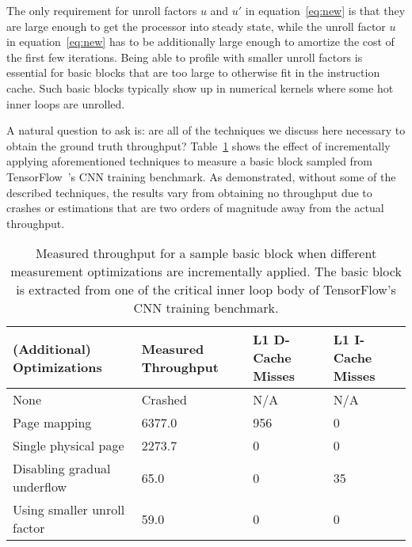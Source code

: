 The only requirement for unroll factors $u$ and $u'$ in equation~\ref{eq:new}
is that they are large enough to get the processor into steady state,
while the unroll factor $u$ in equation~\ref{eq:new} has to be additionally
large enough to amortize the cost of the first few iterations.
Being able to profile with smaller unroll factors is essential
for basic blocks that are too large to otherwise fit in the instruction cache.
Such basic blocks typically show up in numerical kernels where
some hot inner loops are unrolled.

A natural question to ask is: are all of the techniques we discuss
here necessary to obtain the ground truth throughput?
Table~\ref{tab:ablation} shows the effect of incrementally applying
aforementioned techniques to measure a basic block sampled from 
TensorFlow~\cite{tensorflow}'s CNN training benchmark.
As demonstrated, without some of the described techniques,
the results vary from obtaining no throughput due to crashes or
estimations that are two orders of magnitude away from the 
actual throughput.

\begin{table}
\begin{tabular}{
|p{}|p{}|p{}|p{}|}
\hline (Additional) Optimizations &
Measured Throughput &
L1 D-Cache Misses &
L1 I-Cache Misses \\

\hline
None & Crashed & N/A & N/A \\

\hline
Page mapping & 6377.0 & 956 & 0 \\

\hline
Single physical page & 2273.7 & 0 & 0 \\

\hline
Disabling gradual underflow & 65.0 & 0 & 35 \\

\hline
Using smaller unroll factor & 59.0 & 0 & 0\\

\hline
\end{tabular}
\\
\caption{Measured throughput for a sample basic block when
different measurement optimizations are incrementally applied.
The basic block is extracted from one of the critical 
inner loop body of TensorFlow\cite{tensorflow}'s CNN training benchmark.}
\label{tab:ablation}
\end{table}